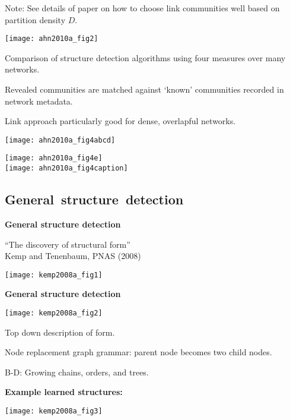   
    
     
      Note: See details of paper on how to choose link communities well
      based on partition density $D$.
    
  


  \texttt{[image: ahn2010a\_fig2]}

  
    
    
      Comparison of structure detection algorithms
      using four measures over many networks.
    
      Revealed communities are matched against 
      `known' communities recorded in network metadata.
    
      Link approach particularly good for dense,
      overlapful networks.
    
  


      
    \texttt{[image: ahn2010a\_fig4abcd]}
    
    \texttt{[image: ahn2010a\_fig4e]}\\
    \texttt{[image: ahn2010a\_fig4caption]}
  
\subsection{General\ structure\ detection}


  \textbf{General structure detection}

  
   
    ``The discovery of structural form''\\
    Kemp and Tenenbaum, PNAS (2008)\cite{kemp2008a}
  
  
  \texttt{[image: kemp2008a\_fig1]}


  \textbf{General structure detection}
  
      
    \texttt{[image: kemp2008a\_fig2]}
    
    
    
      Top down description of form.
    
      Node replacement graph grammar:
      parent node becomes two child nodes.
    
      B-D: Growing chains, orders, and trees.
    
  


  \textbf{Example learned structures:}
  
  \begin{center}
    \texttt{[image: kemp2008a\_fig3]}
  \end{center}

